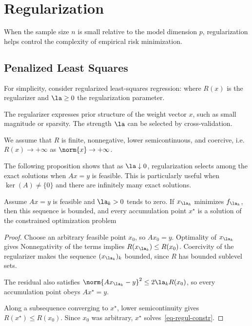 \section{Regularization}

When the sample size $n$ is small relative to the model dimension $p$, regularization helps control the complexity of empirical risk minimization.


                                                                        
\subsection{Penalized Least Squares}

For simplicity, consider regularized least-squares regression:
where $R(x)$ is the regularizer and $\la\geq 0$ the regularization parameter. 
 
The regularizer expresses prior structure of the weight vector $x$, such as small magnitude or sparsity. The strength $\la$ can be selected by cross-validation.

We assume that $R$ is finite, nonnegative, lower semicontinuous, and coercive, i.e. $R(x) \rightarrow +\infty$ as $\norm{x} \rightarrow +\infty$.
 
The following proposition shows that as $\la\downarrow0$, regularization selects among the exact solutions when $Ax=y$ is feasible. This is particularly useful when $\ker(A)\neq\{0\}$ and there are infinitely many exact solutions.

\begin{prop}
	Assume $Ax=y$ is feasible and $\la_k>0$ tends to zero. If $x_{\la_k}$ minimizes $f_{\la_k}$, then this sequence is bounded, and every accumulation point $x^\star$ is a solution of the constrained optimization problem
\end{prop}


\begin{proof}
	Choose an arbitrary feasible point $x_0$, so $Ax_0=y$. Optimality of $x_{\la_k}$ gives
	Nonnegativity of the terms implies $R(x_{\la_k}) \leq  R(x_0)$. Coercivity of the regularizer makes the sequence $(x_{\la_k})_k$ bounded, since $R$ has bounded sublevel sets.
	 
	The residual also satisfies $\norm{Ax_{\la_k}-y}^2\leq2\la_k R(x_0)$, so every accumulation point obeys $Ax^\star = y$.
	 
	Along a subsequence converging to $x^\star$, lower semicontinuity gives $R(x^\star)\leq R(x_0)$. Since $x_0$ was arbitrary, $x^\star$ solves~\eqref{eq-regul-constr}.
\end{proof}

